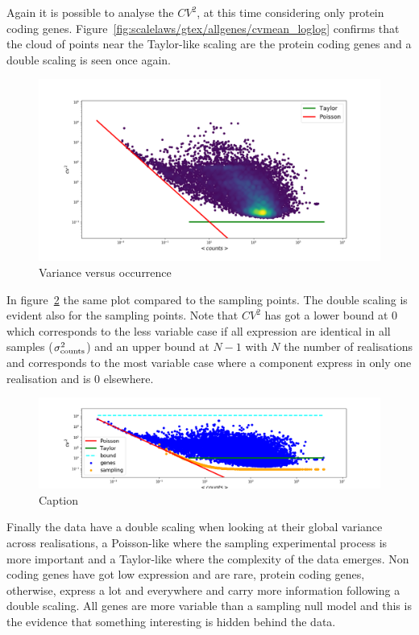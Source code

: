 Again it is possible to analyse the $CV^2$, at this time considering only protein coding genes. Figure~\ref{fig:scalelaws/gtex/allgenes/cvmean_loglog} confirms that the cloud of points near the Taylor-like scaling are the protein coding genes and a double scaling is seen once again.
\begin{figure}[htb!]
    \centering
    \includegraphics[width=0.9\linewidth]{pictures/scalelaws/gtex/cvmean_loglog_density.png}
    \caption{Variance versus occurrence}
    \label{fig:scalelaws/gtex/cvmean_loglog}
\end{figure}

In figure~\ref{fig:scalelaws/gtex/cvmean_loglog_sampling} the same plot compared to the sampling points. The double scaling is evident also for the sampling points. Note that $CV^2$ has got a lower bound at $0$ which corresponds to the less variable case if all expression are identical in all samples ($\sigma^2_{\mathrm{counts}}$) and an upper bound at $N-1$ with $N$ the number of realisations and corresponds to the most variable case where a component  express in only one realisation and is $0$ elsewhere.
\begin{figure}[htb!]
    \centering
    \includegraphics[width=0.9\linewidth]{pictures/scalelaws/gtex/cvmean_loglog_sampling.png}
    \caption{Caption}
    \label{fig:scalelaws/gtex/cvmean_loglog_sampling}
\end{figure}

Finally the data have a double scaling when looking at their global variance across realisations, a Poisson-like where the sampling experimental process is more important and a Taylor-like where the complexity of the data emerges.
Non coding genes have got low expression and are rare, protein coding genes, otherwise, express a lot and everywhere and carry more information following a double scaling. All genes are more variable than a sampling null model and this is the evidence that something interesting is hidden behind the data.

